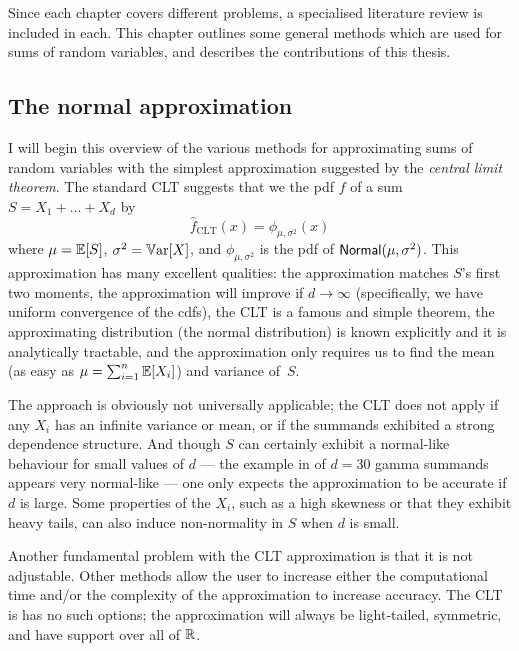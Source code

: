 Since each chapter covers different problems, a specialised literature review is included in each. This chapter outlines some general methods which are used for sums of random variables, and describes the contributions of this thesis.


\subsection{The normal approximation}

I will begin this overview of the various methods for approximating sums of random variables with the simplest approximation suggested by the \emph{central limit theorem}. The standard CLT suggests that we the pdf $f$ of a sum $S = X_1 + \dots + X_d$ by
\[ \hat{f}_{\mathrm{CLT}}(x) = \phi_{\mu,\sigma^2}(x) \]
where $\mu=\operatorname{{\mathbb E}}[S]$, $\sigma^2=\operatorname{\mathbb{V}\mathrm{ar}}[X]$, and $\phi_{\mu,\sigma^2}$ is the pdf of $\mathsf{Normal}(\mu,\sigma^2)$.
This approximation has many excellent qualities: the approximation matches $S$'s first two moments, the approximation will improve if $d \to \infty$ (specifically, we have uniform convergence of the cdfs), the CLT is a famous and simple theorem, the approximating distribution (the normal distribution) is known explicitly and it is analytically tractable, and the approximation only requires us to find the mean (as easy as $\mu = \sum_{i=1}^n \operatorname{{\mathbb E}}[X_i]$) and variance of~$S$.

The approach is obviously not universally applicable; the CLT does not apply if any $X_i$ has an infinite variance or mean, or if the summands exhibited a strong dependence structure. And though $S$ can certainly exhibit a normal-like behaviour for small values of $d$ --- the example in  of $d=30$ gamma summands appears very normal-like --- one only expects the approximation to be accurate if $d$ is large. Some properties of the $X_i$, such as a high skewness or that they exhibit heavy tails, can also induce non-normality in $S$ when $d$ is small.

Another fundamental problem with the CLT approximation is that it is not adjustable. Other methods allow the user to increase either the computational time and/or the complexity of the approximation to increase accuracy. The CLT is has no such options; the approximation will always be light-tailed, symmetric, and have support over all of $\mathbb{R}$.

